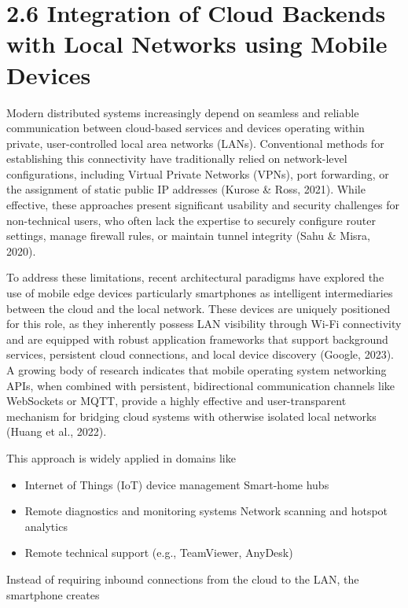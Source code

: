 \documentclass[12pt,a4paper,oneside]{report}
\begin{document}
\section{2.6 Integration of Cloud Backends with Local Networks using Mobile Devices}

Modern distributed systems increasingly depend on seamless and reliable communication between cloud-based services and devices operating within private, user-controlled local area networks (LANs). Conventional methods for establishing this connectivity have traditionally relied on network-level configurations, including Virtual Private Networks (VPNs), port forwarding, or the assignment of static public IP addresses (Kurose \& Ross, 2021). While effective, these approaches present significant usability and security challenges for non-technical users, who often lack the expertise to securely configure router settings, manage firewall rules, or maintain tunnel integrity (Sahu \& Misra, 2020).


To address these limitations, recent architectural paradigms have explored the use of mobile edge devices particularly smartphones as intelligent intermediaries between the cloud and the local network. These devices are uniquely positioned for this role, as they inherently possess LAN visibility through Wi-Fi connectivity and are equipped with robust application frameworks that support background services, persistent cloud connections, and local device discovery (Google, 2023). A growing body of research indicates that mobile operating system networking APIs, when combined with persistent, bidirectional communication channels like WebSockets or MQTT, provide a highly effective and user-transparent mechanism for bridging cloud systems with otherwise isolated local networks (Huang et al., 2022).




This approach is widely applied in domains like


\begin{itemize}
  \item Internet of Things (IoT) device management \textbullet{} Smart-home hubs
  \item Remote diagnostics and monitoring systems \textbullet{} Network scanning and hotspot analytics
  \item Remote technical support (e.g., TeamViewer, AnyDesk)
\end{itemize}

Instead of requiring inbound connections from the cloud to the LAN, the smartphone creates
\end{document}
